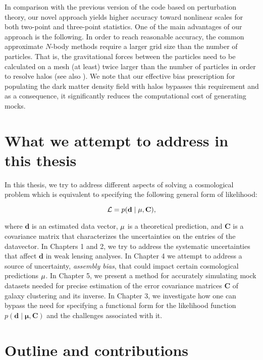 In comparison with the previous version of the code based on perturbation theory, our novel approach yields higher accuracy toward nonlinear scales for both two-point 
and three-point statistics. One of the main advantages of our approach is the following. In order to reach reasonable accuracy, the common approximate $N$-body methods \citep{qpm,fastpm,ice_cola} require a larger grid size than the number of particles. That is, the gravitational forces between the particles need to be calculated on a mesh (at least) twice larger than the number of particles in order to resolve halos (see also \citealt{chuang2015,monaco2016}). We note that our effective bias prescription for populating the dark matter density field with halos bypasses this requirement and as a consequence, it significantly reduces the computational cost of generating mocks.      

\section{What we attempt to address in this thesis}

In this thesis, we try to address different aspects of solving a cosmological problem which is equivalent to specifying the following general form of likelihood:

\begin{equation}
\mathcal{L} = p(\mathbf{d} \; | \; \bf{\mu} , \mathbf{C}),
\end{equation}

where $\mathbf{d}$ is an estimated data vector, $\bf{\mu}$ is a theoretical prediction, and $\mathbf{C}$ is a covariance matrix that characterizes the uncertainties on the entries of the datavector. In Chapters 1 and 2, we try to address the systematic uncertainties that affect $\mathbf{d}$ in weak lensing analyses. In Chapter 4 we attempt to address a source of uncertainty, \emph{assembly bias}, that could impact certain cosmological predictions $\bf{\mu}$. In Chapter 5, we present a method for accurately simulating mock datasets needed for precise estimation of the error covariance matrices $\mathbf{C}$ of galaxy clustering and its inverse. In Chapter 3, we investigate how one can bypass the need for specifying a functional form for the likelihood function $p(\mathbf{d} \; | \; \mathbf{\mu} , \mathbf{C})$ and the challenges associated with it.

\section{Outline and contributions}

